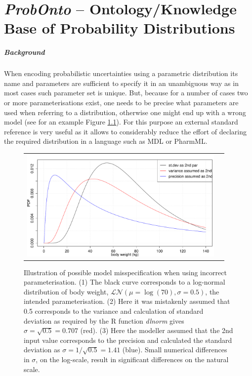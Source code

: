 \chapter{\emph{ProbOnto} -- Ontology/Knowledge Base of Probability Distributions}
\label{ch:ProbOnto}


\paragraph{Background}
When encoding probabilistic uncertainties using a parametric distribution its name and 
parameters are sufficient to specify it in an unambiguous way as 
in most cases such parameter set is unique. But, because for a number of cases 
two or more parameterisations exist, one needs to be precise what 
parameters are used when referring to a distribution, otherwise one might 
end up with a wrong model (see for an example Figure \ref{fig:whatCanGoWrong}).
For this purpose an external standard reference is very useful as it allows to 
considerably reduce the effort of declaring the required distribution in a language 
such as MDL or PharmML.

\begin{figure}[htb!]
\centering
\begin{tabular}{cc}
 \includegraphics[width=100mm]{pics/whatCanGoWrong}
\end{tabular}
\caption{Illustration of possible model misspecification when using incorrect 
parameterisation. (1) The black curve corresponds to a log-normal 
distribution of body weight, $\mathcal {LN}(\mu\!=\!\log(70),\sigma\!=\!0.5)$, the 
intended parameterisation. (2) Here it was mistakenly assumed that 0.5 corresponds 
to the variance and calculation of standard deviation as required by the R function 
\emph{dlnorm} gives $\sigma = \sqrt{0.5}=0.707$ (red). (3) Here the modeller 
assumed that the 2nd input value corresponds to the precision and calculated the 
standard deviation as $\sigma = 1/\sqrt{0.5}=1.41$ (blue). Small numerical 
differences in $\sigma$, on the log-scale, result in significant differences on the natural scale.}
\label{fig:whatCanGoWrong}
\end{figure}

